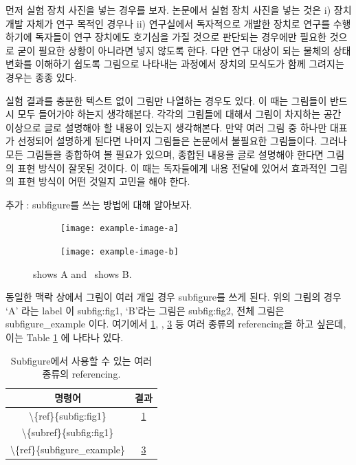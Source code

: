 \documentclass[twoside,11pt]{gshs_thesis}
\begin{document}
먼저 실험 장치 사진을 넣는 경우를 보자. 논문에서 실험 장치 사진을 넣는 것은 i) 장치 개발 자체가 연구 목적인 경우나 ii) 연구실에서 독자적으로 개발한 장치로 연구를 수행하기에 독자들이 연구 장치에도 호기심을 가질 것으로 판단되는 경우에만 필요한 것으로 굳이 필요한 상황이 아니라면 넣지 않도록 한다. 다만 연구 대상이 되는 물체의 상태 변화를 이해하기 쉽도록 그림으로 나타내는 과정에서 장치의 모식도가 함께 그려지는 경우는 종종 있다.

실험 결과를 충분한 텍스트 없이 그림만 나열하는 경우도 있다. 이 때는 그림들이 반드시 모두 들어가야 하는지 생각해본다. 각각의 그림들에 대해서 그림이 차지하는 공간 이상으로 글로 설명해야 할 내용이 있는지 생각해본다. 만약 여러 그림 중 하나만 대표가 선정되어 설명하게 된다면 나머지 그림들은 논문에서 불필요한 그림들이다. 그러나 모든 그림들을 종합하여 볼 필요가 있으며, 종합된 내용을 글로 설명해야 한다면 그림의 표현 방식이 잘못된 것이다. 이 때는 독자들에게 내용 전달에 있어서 효과적인 그림의 표현 방식이 어떤 것일지 고민을 해야 한다.

추가 : subfigure를 쓰는 방법에 대해 알아보자.

\begin{figure}[h]
	\centering
	\begin{subfigure}[t]{0.5\linewidth}
		\centering\texttt{[image: example-image-a]}
		\caption{\label{subfig:fig1}}
	\end{subfigure}%
	\begin{subfigure}[t]{0.5\linewidth}
		\centering\texttt{[image: example-image-b]}
		\caption{\label{subfig:fig2}}
	\end{subfigure}
	\caption{ shows A and~ shows B.}
	\label{subfigure_example}
\end{figure}

동일한 맥락 상에서 그림이 여러 개일 경우 subfigure를 쓰게 된다. 위의 그림의 경우 `A' 라는 label 이 subfig:fig1, `B'라는 그림은 subfig:fig2, 전체 그림은 subfigure\_example 이다. 여기에서 \ref{subfig:fig1}, , \ref{subfigure_example} 등 여러 종류의 referencing을 하고 싶은데, 이는 Table \ref{table_subfigure_ref} 에 나타나 있다. 
\begin{table}[h]
	\caption{Subfigure에서 사용할 수 있는 여러 종류의 referencing.}
	\label{table_subfigure_ref}
	\begin{center}
		\begin{tabular}{|c|c|}
			\hline
			명령어 & 결과 \\
			\hline
			\textbackslash\{ref\}\{subfig:fig1\} & \ref{subfig:fig1} \\
			\hline
			\textbackslash\{subref\}\{subfig:fig1\} & \subref{subfig:fig1} \\
			\hline
			\textbackslash\{ref\}\{subfigure\_example\} & \ref{subfigure_example} \\
			\hline
		\end{tabular}
	\end{center}
\end{table}
\end{document}
